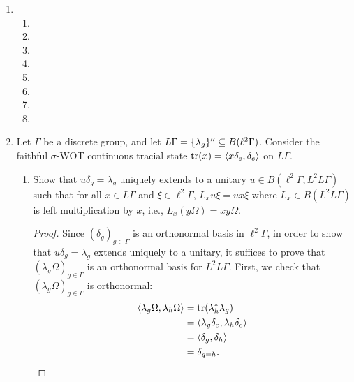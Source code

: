 \documentclass[a4paper,10pt]{report}
\newcommand{\ggen}[1]{\langle#1\rangle}
\newcommand{\pn}[2]{||#1||_{#2}}
\newcommand{\norm}[1]{||#1||}
\DeclarePairedDelimiter{\set}{\{}{\}}
\begin{document}
\begin{enumerate}
\begin{enumerate}
\begin{enumerate}
						\begin{proof}
						If $\varphi$ is faithful, then for $x\neq y$, we have 
							\begin{align*}
								\norm{\pi_\varphi(x-y)}^2 &\ge \pn{\pi_\varphi(x-y)\Omega}{\varphi}^2\\
								&= \varphi((x-y)^*(x-y))\\
								& > 0,
							 \end{align*}
							since $(x - y)^*(x- y)$ is a nonzero positive operator.
							Hence, $\pi_\varphi$ is a faithful representation and the claim follows from (2).
							\end{proof}
				\end{enumerate}
		\end{enumerate}
		\setcounter{enumi}{90}
		\newpage
 \item 
		\begin{enumerate}
			\item 
			\item 
			\item 
			\item 
			\item 
			\item 
			\item 
			\item 
		\end{enumerate}
		\newpage
 \item 
 Let $\Gamma$ be a discrete group, and let $L\Gamma = \set{\lambda_g}'' \subseteq B(\ell^2\Gamma)$.
 Consider the faithful $\sigma$-WOT continuous tracial state
 $\tr(x) = \ggen{x\delta_e, \delta_e}$ on $L\Gamma$.
		\begin{enumerate}
			\item Show that $u\delta_g = \lambda_g$ uniquely extends to a unitary
				$u \in B(\ell^2\Gamma, L^2L\Gamma)$ such that for all $x \in L\Gamma$
				and $\xi \in \ell^2\Gamma$, $L_xu\xi = ux\xi$ where $L_x \in B(L^2L\Gamma)$
				is left multiplication by $x$, i.e., $L_x(y\Omega) = xy\Omega$.
				\begin{proof}
					Since $(\delta_g)_{g \in \Gamma}$ is an orthonormal basis in $\ell^2\Gamma$,
					in order to show that $u\delta_g = \lambda_g$ extends uniquely to a unitary,
					it suffices to prove that $(\lambda_g\Omega)_{g \in \Gamma}$ is an
					orthonormal basis for $L^2L\Gamma$.
					First, we check that $(\lambda_g\Omega)_{g \in \Gamma}$ is orthonormal:
					\begin{align*}
						\ggen{\lambda_g\Omega, \lambda_h\Omega}
						 & = \tr(\lambda_h^*\lambda_g) \\
						 & = \ggen{\lambda_g\delta_e, \lambda_h\delta_e} \\
						 & = \ggen{\delta_g, \delta_h} \\
						 & = \delta_{g = h}.
					\end{align*}
					

\end{proof}
\end{enumerate}
\end{enumerate}
\end{document}
